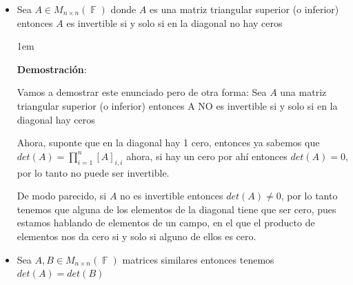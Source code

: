 \documentclass[12pt, fleqn]{report}                             %
\newenvironment{SmallIndentation}[1][0.75em]                    %
        {\begin{adjustwidth}{#1}{}\begin{footnotesize}}             %
        {\end{footnotesize}\end{adjustwidth}}                       %
\theoremstyle{break}                                            %
\DeclareMathOperator \GenericField {\mathbb{F}}                 %
\begin{document}
\begin{itemize}
\begin{SmallIndentation}[1em]
                            Ahora, sabemos que $det(A^T) = det(A)$, por lo tanto ya esta demostrado para matrices
                            triangulares inferiores.

                        \end{SmallIndentation}

                    \clearpage


                    \item
                        Sea $A \in M_{n \times n}(\GenericField)$ donde $A$ es una matriz triangular
                        superior (o inferior) entonces $A$ es invertible si y solo si en la diagonal no hay ceros

                        \begin{SmallIndentation}[1em]
                            \textbf{Demostración}:

                            Vamos a demostrar este enunciado pero de otra forma: Sea $A$ una matriz triangular
                            superior (o inferior) entonces A NO es invertible si y solo si en la diagonal hay ceros
                            
                            Ahora, suponte que en la diagonal hay 1 cero, entonces ya sabemos que 
                            $det(A) = \prod_{i = 1}^n [A]_{i, i}$ ahora, si hay un cero por ahí entonces
                            $det(A) = 0$, por lo tanto no puede ser invertible.

                            De modo parecido, si $A$ no es invertible entonces $det(A) \neq 0$, por lo tanto
                            tenemos que alguna de los elementos de la diagonal tiene que ser cero, pues estamos hablando
                            de elementos de un campo, en el que el producto de elementos nos da cero si y solo si alguno de 
                            ellos es cero.

                        \end{SmallIndentation}

                    \item
                        Sea $A, B \in M_{n \times n}(\GenericField)$ matrices similares entonces tenemos
                        $det(A) = det(B)$

                \end{itemize}



        \clearpage
\end{document}
